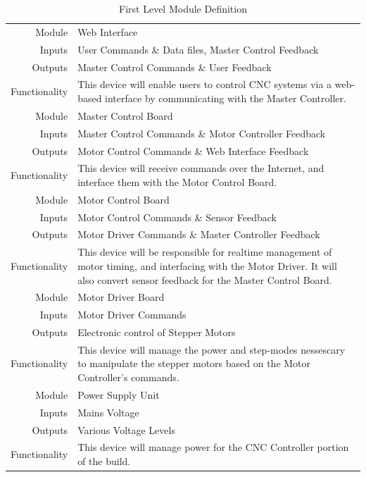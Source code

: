 \begin{table}[H] 
	\caption{First Level Module Definition}
	\label{table:firstlevel}
	\centering 
	\begin{tabular}{|r p{10cm}|} 
		\hline\hline 
		Module		& Web Interface \\ 
		Inputs		& User Commands \& Data files, Master Control Feedback	\\ 
		Outputs		& Master Control Commands \& User Feedback \\ 
		Functionality	& This device will enable users to control CNC systems via a web-based interface by communicating with the Master Controller.\\ 
		\hline\hline 
		Module		& Master Control Board \\ 
		Inputs		& Master Control Commands \& Motor Controller Feedback	\\ 
		Outputs		& Motor Control Commands \& Web Interface Feedback \\ 
		Functionality	& This device will receive commands over the Internet, and interface them with the Motor Control Board. \\
		\hline\hline 
		Module		& Motor Control Board \\ 
		Inputs		& Motor Control Commands \& Sensor Feedback	\\ 
		Outputs		& Motor Driver Commands \& Master Controller Feedback \\ 
		Functionality	& This device will be responsible for realtime management of motor timing, and interfacing with the Motor Driver. It will also convert sensor feedback for the Master Control Board.\\
		\hline\hline 
		Module		& Motor Driver Board \\ 
		Inputs		& Motor Driver Commands \\ 
		Outputs		& Electronic control of Stepper Motors \\ 
		Functionality	& This device will manage the power and step-modes nessescary to manipulate the stepper motors based on the Motor Controller's commands. \\
		\hline\hline 
		Module		& Power Supply Unit \\ 
		Inputs		& Mains Voltage	\\ 
		Outputs		& Various Voltage Levels \\ 
		Functionality	& This device will manage power for the CNC Controller portion of the build. \\
		\hline
		\end{tabular} 
\end{table}

